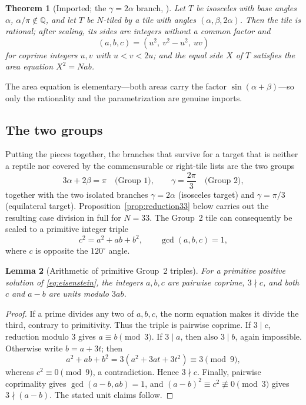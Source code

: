 \documentclass[11pt]{amsart}
\newtheorem{theorem}{Theorem}
\newtheorem{lemma}[theorem]{Lemma}
\theoremstyle{definition}
\theoremstyle{remark}
\newcommand{\Q}{\mathbb Q}
\begin{document}
\begin{theorem}[Imported; the $\gamma=2\alpha$ branch,
{\cite[Thm.~10.5, Lemma~11.2, Lemma~11.4]{BeesonIso}}]
\label{thm:imp-g2a}
Let $T$ be isosceles with base angles $\alpha$, $\alpha/\pi\notin\Q$, and
let $T$ be $N$-tiled by a tile with angles $(\alpha,\beta,2\alpha)$.  Then
the tile is rational; after scaling, its sides are integers without a common
factor and
\[
   (a,b,c)=(u^2,\ v^2-u^2,\ uv)
\]
for coprime integers $u,v$ with $u<v<2u$; and the equal side $X$ of $T$
satisfies the area equation $X^2=Nab$.
\end{theorem}

\noindent The area equation is elementary---both areas carry the factor
$\sin(\alpha+\beta)$---so only the rationality and the parametrization are
genuine imports.

\subsection{The two groups}\label{sec:twogroups}

Putting the pieces together, the branches that survive for a target that is
neither a reptile nor covered by the commensurable or right-tile lists are
the two groups
\[
  3\alpha+2\beta=\pi \quad\text{(Group 1)},\qquad
  \gamma=\frac{2\pi}{3}\quad\text{(Group 2)},
\]
together with the two isolated branches $\gamma=2\alpha$ (isosceles target)
and $\gamma=\pi/3$ (equilateral target).  Proposition~\ref{prop:reduction33}
below carries out the resulting case division in full for $N=33$.  The Group~2 tile can consequently be scaled to a primitive
integer triple
\begin{equation}\label{eq:eisenstein}
       c^2=a^2+ab+b^2,\qquad \gcd(a,b,c)=1,
\end{equation}
where $c$ is opposite the $120^\circ$ angle.

\begin{lemma}[Arithmetic of primitive Group~2 triples]\label{lem:g2-units}
For a primitive positive solution of \eqref{eq:eisenstein}, the integers
$a,b,c$ are pairwise coprime, $3\nmid c$, and both $c$ and $a-b$ are units
modulo $3ab$.
\end{lemma}

\begin{proof}
If a prime divides any two of $a,b,c$, the norm equation makes it divide the
third, contrary to primitivity.  Thus the triple is pairwise coprime.  If
$3\mid c$, reduction modulo $3$ gives $a\equiv b\pmod3$.  If $3\mid a$,
then also $3\mid b$, again impossible.  Otherwise write $b=a+3t$; then
\[
 a^2+ab+b^2=3(a^2+3at+3t^2)\equiv3\pmod9,
\]
whereas $c^2\equiv0\pmod9$, a contradiction.  Hence $3\nmid c$.  Finally,
pairwise coprimality gives $\gcd(a-b,ab)=1$, and
$(a-b)^2\equiv c^2\not\equiv0\pmod3$ gives $3\nmid(a-b)$.  The stated unit
claims follow.
\end{proof}
\end{document}
